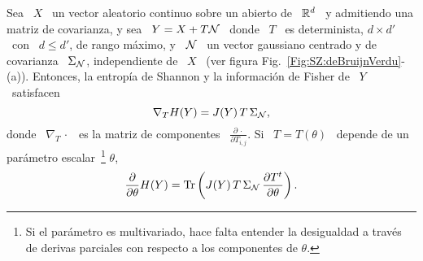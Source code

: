 \begin{teorema}
\label{Teo:SZ:DeBruijn}
%
  Sea \ $X$ \  un vector aleatorio continuo sobre un abierto  de \ $\mathbb{R}^d$ \ y
  admitiendo una matriz de covarianza, y sea \  $Y = X + T \mathcal{N}$ \ donde \ $T$
  \ es determinista, $d  \times d'$ \ con \ $ d \le d'$,  de rango m\'aximo, y \
  $\mathcal{N}$ \  un vector  gaussiano centrado y  de covarianza  \ $\Sigma_{\mathcal{N}}$,
  independiente  de \  $X$ \  (ver  figura Fig.~\ref{Fig:SZ:deBruijnVerdu}-(a)).
  Entonces, la  entrop\'ia de Shannon  y la informaci\'on  de Fisher de \  $Y$ \
  satisfacen
  \[
  \nabla_T H(Y) = J(Y) \, T \, \Sigma_{\mathcal{N}},
  \]
  donde \ $\nabla_T \, \cdot$ \ es la matriz de componentes \ $\frac{\partial \,
    \cdot}{\partial T_{i,j}}$.  Si \ $T = T(\theta)$ \ depende de un par\'ametro
  escalar~\footnote{Si el  par\'ametro es  multivariado, hace falta  entender la
    desigualdad a trav\'es de derivas parciales con respecto a los componentes de
    $\theta$.}  $\theta$,
  \[
  \frac{\partial}{\partial \theta}  H(Y) = \operatorname{Tr}\left( J(Y) \,  T \, \Sigma_{\mathcal{N}}
    \, \frac{\partial T^t}{\partial \theta} \right).
  \]
\end{teorema}
%

